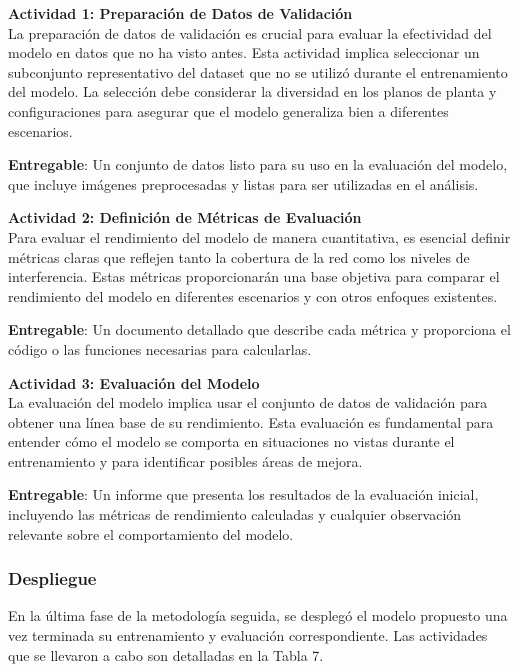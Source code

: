 \textbf{Actividad 1: Preparación de Datos de Validación}
\\
La preparación de datos de validación es crucial para evaluar la efectividad del modelo en datos que no ha visto antes. Esta actividad implica seleccionar un subconjunto representativo del dataset que no se utilizó durante el entrenamiento del modelo. La selección debe considerar la diversidad en los planos de planta y configuraciones para asegurar que el modelo generaliza bien a diferentes escenarios.

\textbf{Entregable}: Un conjunto de datos listo para su uso en la evaluación del modelo, que incluye imágenes preprocesadas y listas para ser utilizadas en el análisis.

\textbf{Actividad 2: Definición de Métricas de Evaluación}
\\
Para evaluar el rendimiento del modelo de manera cuantitativa, es esencial definir métricas claras que reflejen tanto la cobertura de la red como los niveles de interferencia. Estas métricas proporcionarán una base objetiva para comparar el rendimiento del modelo en diferentes escenarios y con otros enfoques existentes.

\textbf{Entregable}: Un documento detallado que describe cada métrica y proporciona el código o las funciones necesarias para calcularlas.

\vspace{0.5cm}
\textbf{Actividad 3: Evaluación del Modelo}
\\
La evaluación del modelo implica usar el conjunto de datos de validación para obtener una línea base de su rendimiento. Esta evaluación es fundamental para entender cómo el modelo se comporta en situaciones no vistas durante el entrenamiento y para identificar posibles áreas de mejora.

\textbf{Entregable}: Un informe que presenta los resultados de la evaluación inicial, incluyendo las métricas de rendimiento calculadas y cualquier observación relevante sobre el comportamiento del modelo.

\subsubsection{Despliegue}
En la última fase de la metodología seguida, se desplegó el modelo propuesto una vez terminada su entrenamiento y evaluación correspondiente. Las actividades que se llevaron a cabo son detalladas en la Tabla 7.

